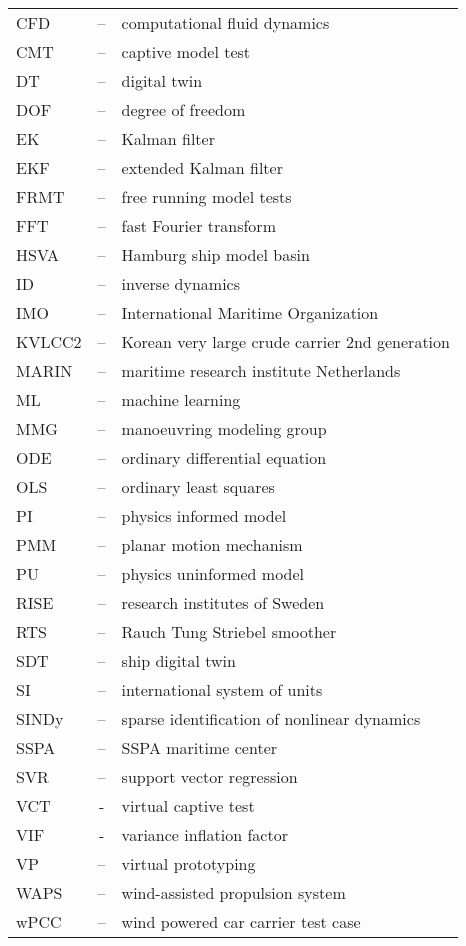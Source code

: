 
\begin{tabular}{ l c l }
CFD & -- & computational fluid dynamics\\
CMT & -- & captive model test \\
DT  & -- & digital twin\\
DOF & -- & degree of freedom\\
EK & -- & Kalman filter \\
EKF & -- & extended Kalman filter \\
FRMT & -- & free running model tests \\
FFT & -- & fast Fourier transform\\
HSVA & -- & Hamburg ship model basin \\
ID & -- & inverse dynamics \\
IMO & -- & International Maritime Organization \\
KVLCC2 & -- & Korean very large crude carrier 2nd generation \\
MARIN & -- & maritime research institute Netherlands \\
ML & -- & machine learning \\
MMG & -- & manoeuvring modeling group \\
ODE & -- & ordinary differential equation\\
OLS & -- & ordinary least squares\\
PI & -- & physics informed model \\ 
PMM & -- & planar motion mechanism \\ 
PU & -- & physics uninformed model \\
RISE & -- & research institutes of Sweden \\
RTS & -- & Rauch Tung Striebel smoother \\
SDT  & -- & ship digital twin\\
SI  & -- & international system of units\\
SINDy  & -- & sparse identification of nonlinear dynamics \\
SSPA & -- & SSPA maritime center \\
SVR & -- & support vector regression \\
VCT & - & virtual captive test \\
VIF & - & variance inflation factor \\
VP & -- & virtual prototyping \\
WAPS & -- & wind-assisted propulsion system\\
wPCC & -- & wind powered car carrier test case\\
\end{tabular}
